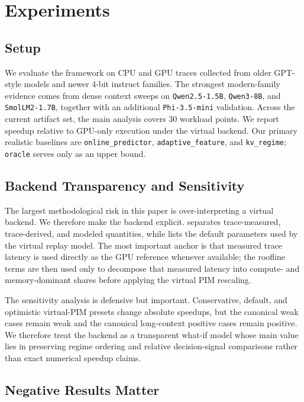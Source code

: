 \section{Experiments}
\label{sec:experiments}

\subsection{Setup}

We evaluate the framework on CPU and GPU traces collected from older GPT-style models and newer 4-bit instruct families. The strongest modern-family evidence comes from dense context sweeps on \texttt{Qwen2.5-1.5B}, \texttt{Qwen3-8B}, and \texttt{SmolLM2-1.7B}, together with an additional \texttt{Phi-3.5-mini} validation. Across the current artifact set, the main analysis covers 30 workload points. We report speedup relative to GPU-only execution under the virtual backend. Our primary realistic baselines are \texttt{online\_predictor}, \texttt{adaptive\_feature}, and \texttt{kv\_regime}; \texttt{oracle} serves only as an upper bound.

\subsection{Backend Transparency and Sensitivity}

The largest methodological risk in this paper is over-interpreting a virtual backend. We therefore make the backend explicit.  separates trace-measured, trace-derived, and modeled quantities, while  lists the default parameters used by the virtual replay model. The most important anchor is that measured trace latency is used directly as the GPU reference whenever available; the roofline terms are then used only to decompose that measured latency into compute- and memory-dominant shares before applying the virtual PIM rescaling.

The sensitivity analysis is defensive but important. Conservative, default, and optimistic virtual-PIM presets change absolute speedups, but the canonical weak cases remain weak and the canonical long-context positive cases remain positive. We therefore treat the backend as a transparent what-if model whose main value lies in preserving regime ordering and relative decision-signal comparisons rather than exact numerical speedup claims.

\subsection{Negative Results Matter}

